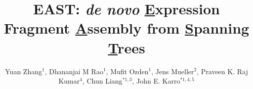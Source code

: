 \documentclass{bioinfo}
\begin{document}

\title[EAST transcript assembler]{EAST: \textit{de novo} {\underline E}xpression Fragment {\underline A}ssembly from {\underline S}panning {\underline T}rees}
\author[Zhang \textit{et~al.}]{Yuan Zhang$^1$, Dhananjai M Rao$^1$,
  Mufit Ozden$^1$, Jens Mueller$^2$, Praveen K. Raj Kumar$^4$, Chun
  Liang$^{*1,3}$, John E. Karro$^{*1,4,5}$}

\address{$^1$ Department of Computer Science and Software Engineering, \\
  $^2$ Information Technology Services,
  $^3$ Department of Botany, \\
  $^4$ Department of Microbiology, and
  $^5$ Department of Statistics \\ 
at Miami University, Oxford OHIO, USA
}













\maketitle
\end{document}
